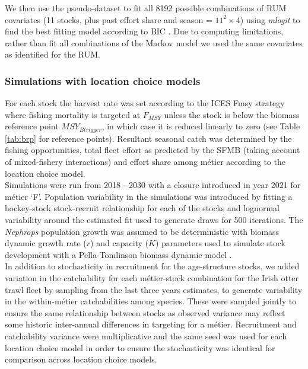 \documentclass[12pt, halfline, a4paper]{ouparticle}
\begin{document}
We then use the pseudo-dataset to fit all 8192 possible combinations of RUM
covariates (11 stocks, plus past effort share and season = $11^2 \times 4$)
using \textit{mlogit} to find the best fitting model according to BIC
\citep{Schwarz1978}. Due to computing limitations, rather than fit all
combinations of the Markov model we used the same covariates as identified for
the RUM.

\subsubsection{Simulations with location choice models}

For each stock the harvest rate was set according to the ICES Fmsy strategy
where fishing mortality is targeted at $F_{MSY}$ unless the stock is below the
biomass reference point $MSY_{Btrigger}$, in which case it is reduced linearly to
zero (see Table \ref{tab:brp} for reference points). Resultant seasonal catch
was determined by the fishing opportunities, total fleet effort as predicted by
the SFMB (taking account of mixed-fishery interactions) and effort share among
métier according to the location choice model. \\

Simulations were run from 2018 - 2030 with a closure introduced in year 2021
for métier `F'. Population variability in the simulations was introduced by fitting a
hockey-stock stock-recruit relationship for each of the stocks and lognormal
variability around the estimated fit used to generate draws for 500 iterations.
The \textit{Nephrops} population growth was assumed to be deterministic with biomass
dynamic growth rate ($r$) and capacity ($K$) parameters used to simulate stock
development with a Pella-Tomlinson biomass dynamic model \citep{Pella1969}. \\

In addition to stochasticity in recruitment for the age-structure stocks, we
added variation in the catchability for each métier-stock combination for the
Irish otter trawl fleet by sampling from the last three years estimates, to
generate variability in the within-métier catchabilities among species. These
were sampled jointly to ensure the same relationship between stocks as observed variance
may reflect some historic inter-annual differences in targeting for a métier.
Recruitment and catchability variance were multiplicative and the same seed was
used for each location choice model in order to ensure the stochasticity was
identical for comparison across location choice models.
\end{document}
